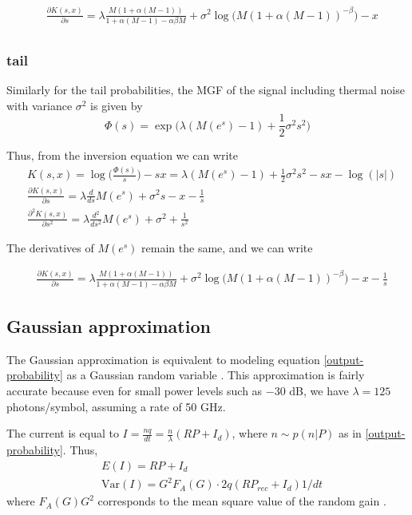 \documentclass[a4paper]{article}
\begin{document}
\begin{align}
&\frac{\partial K(s,x)}{\partial s} = \lambda \frac{M(1 + \alpha (M-1))}{1 + \alpha(M-1) - \alpha\beta M} + \sigma^2\log\Big(M(1 + \alpha(M-1))^{-\beta}\Big) - x \\
\end{align}

\subsubsection{tail}
Similarly for the tail probabilities, the MGF of the signal including thermal noise with variance $\sigma^2$ is given by
\begin{equation}
\Phi (s) = \exp\Big(\lambda (M(e^s) - 1) + \frac{1}{2}\sigma^2s^2\Big)
\end{equation}

Thus, from the inversion equation we can write
\begin{align}
& K(s,x) = \log \Big(\frac{\Phi(s)}{s}\Big) - sx = \lambda (M(e^s) - 1) + \frac{1}{2}\sigma^2s^2 - sx - \log(|s|) \\
&\frac{\partial K(s,x)}{\partial s} = \lambda \frac{d}{ds}M(e^s) + \sigma^2s - x - \frac{1}{s} \\
&\frac{\partial^2 K(s,x)}{\partial s^2} = \lambda \frac{d^2}{ds^2}M(e^s) + \sigma^2 + \frac{1}{s^2} 
\end{align}

The derivatives of $M(e^s)$ remain the same, and we can write

\begin{align}
&\frac{\partial K(s,x)}{\partial s} = \lambda \frac{M(1 + \alpha (M-1))}{1 + \alpha(M-1) - \alpha\beta M} + \sigma^2\log\Big(M(1 + \alpha(M-1))^{-\beta}\Big) - x -\frac{1}{s}
\end{align}

\subsection{Gaussian approximation}
The Gaussian approximation is equivalent to modeling equation \eqref{output-probability} as a Gaussian random variable \cite{personick-comp-4methos}. This approximation is fairly accurate because even for small power levels such as $-30$ dB, we have $\lambda = 125$ photons/symbol, assuming a rate of 50 GHz.

The current is equal to $I = \frac{nq}{dt} = \frac{n}{\lambda}(RP + I_d)$, where $n \sim p(n|P)$ as in \eqref{output-probability}. Thus, 
\begin{align}
& E(I) = RP + I_d \\
& \mathrm{Var}(I) = G^2F_A(G)\cdot 2q(RP_{rec} + I_d)1/dt
\end{align}
where $F_A(G)G^2$ corresponds to the mean square value of the random gain \cite{personick-comp-4methos}.
\end{document}
